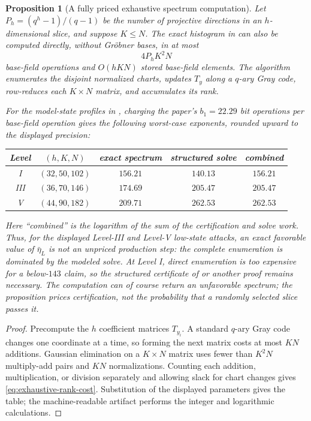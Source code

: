 \documentclass[11pt]{article}
\newtheorem{proposition}[proposition]{Proposition}
\begin{document}
\begin{proposition}[A fully priced exhaustive spectrum computation]
\label{prop:exhaustive-rank-cost}
Let $P_h=(q^h-1)/(q-1)$ be the number of projective directions in an
$h$-dimensional slice, and suppose $K\le N$.  The exact histogram in
 can also be computed directly, without
Gr\"obner bases, in at most
\begin{equation}\label{eq:exhaustive-rank-cost}
 4P_hK^2N
\end{equation}
base-field operations and $O(hKN)$ stored base-field elements.  The algorithm
enumerates the disjoint normalized charts, updates $T_y$ along a $q$-ary Gray
code, row-reduces each $K\times N$ matrix, and accumulates its rank.

For the model-state profiles in , charging the paper's
$b_1=22.29$ bit operations per base-field operation gives the following
worst-case exponents, rounded upward to the displayed precision:
\begin{center}
\begin{tabular}{@{}c c c c c@{}}
\toprule
Level & $(h,K,N)$ & exact spectrum & structured solve & combined\\
\midrule
I   & $(32,50,102)$ & $156.21$ & $140.13$ & $156.21$\\
III & $(36,70,146)$ & $174.69$ & $205.47$ & $205.47$\\
V   & $(44,90,182)$ & $209.71$ & $262.53$ & $262.53$\\
\bottomrule
\end{tabular}
\end{center}
Here ``combined'' is the logarithm of the sum of the certification and solve
work.  Thus, for the displayed Level-III and Level-V low-state attacks, an
exact favorable value of $\bar\eta_L$ is not an unpriced production step: the
complete enumeration is dominated by the modeled solve.  At Level I, direct
enumeration is too expensive for a below-$143$ claim, so the structured
certificate of  or another proof remains
necessary.  The computation can of course return an unfavorable spectrum; the
proposition prices certification, not the probability that a randomly selected
slice passes it.
\end{proposition}

\begin{proof}
Precompute the $h$ coefficient matrices $T_{y_i}$.  A standard $q$-ary Gray
code changes one coordinate at a time, so forming the next matrix costs at most
$KN$ additions.  Gaussian elimination on a $K\times N$ matrix uses fewer than
$K^2N$ multiply-add pairs and $KN$ normalizations.  Counting each addition,
multiplication, or division separately and allowing slack for chart changes
gives \eqref{eq:exhaustive-rank-cost}.  Substitution of the displayed
parameters gives the table; the machine-readable artifact performs the integer
and logarithmic calculations.
\end{proof}
\end{document}
